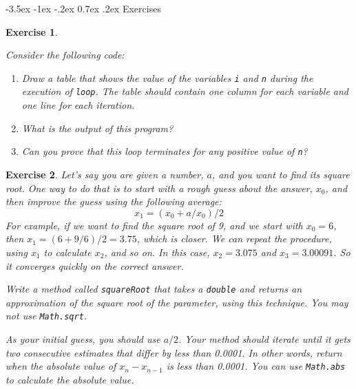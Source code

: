 \documentclass[12pt]{book}
\makeatletter
\theoremstyle{exercise}
\newtheorem{exercise}{Exercise}[chapter]
\newcommand{\java}[1]{\verb"#1"}
\renewcommand{\section}{\@startsection {section}{1}{\z@}%
    {-3.5ex \@plus -1ex \@minus -.2ex}%
    {0.7ex \@plus.2ex}%
    {\normalfont\Large\bfseries}}
\newcommand{\java}[1]{\lstinline{#1}} %
\makeatother
\begin{document}
\section{Exercises}


\begin{exercise}
\label{infloop}

Consider the following code:


\begin{enumerate}

\item Draw a table that shows the value of the variables \java{i} and \java{n} during the execution of \java{loop}.
The table should contain one column for each variable and one line for each iteration.

\item What is the output of this program?

\item Can you prove that this loop terminates for any positive value of \java{n}?

\end{enumerate}

\end{exercise}


\begin{exercise}

Let's say you are given a number, $a$, and you want to find its square root.
One way to do that is to start with a rough guess about the answer, $x_0$, and then improve the guess using the following average:
%
\[ x_1 =(x_0 + a/x_0) / 2 \]
%
For example, if we want to find the square root of 9, and we start with $x_0 = 6$, then $x_1 = (6 + 9/6) / 2 = 3.75$, which is closer.
We can repeat the procedure, using $x_1$ to calculate $x_2$, and so on.
In this case, $x_2 = 3.075$ and $x_3 = 3.00091$.
So it converges quickly on the correct answer.

Write a method called \java{squareRoot} that takes a \java{double} and returns an approximation of the square root of the parameter, using this technique.
You may not use \java{Math.sqrt}.

As your initial guess, you should use $a/2$.
Your method should iterate until it gets two consecutive estimates that differ by less than 0.0001.
In other words, return when the absolute value of $x_n - x_{n-1}$ is less than 0.0001.
You can use \java{Math.abs} to calculate the absolute value.

\end{exercise}
\end{document}
